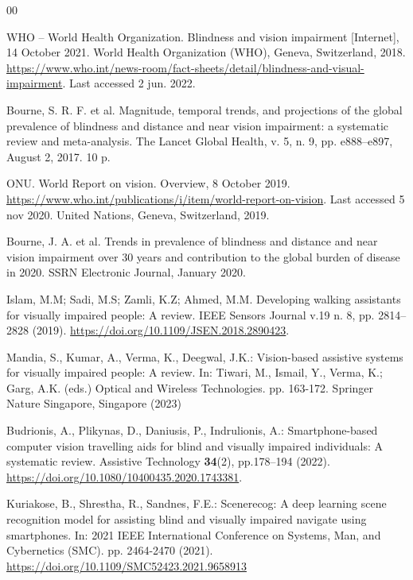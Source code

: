 \documentclass[final,5p,times,twocolumn]{elsarticle}
\begin{document}
\begin{thebibliography}{00}


WHO – World Health Organization. Blindness and vision impairment [Internet], 14 October 2021. World Health Organization (WHO), Geneva, Switzerland, 2018. \url{https://www.who.int/news-room/fact-sheets/detail/blindness-and-visual-impairment}. Last accessed 2 jun. 2022.

Bourne, S. R. F. et al. Magnitude, temporal trends, and projections of the global prevalence of blindness and distance and near vision impairment: a systematic review and meta-analysis. The Lancet Global Health, v. 5, n. 9, pp. e888--e897, August 2, 2017. 10 p.

ONU. World Report on vision. Overview, 8 October 2019. \url{https://www.who.int/publications/i/item/world-report-on-vision}. Last accessed 5 nov 2020. United Nations, Geneva, Switzerland, 2019.

Bourne, J. A. et al. Trends in prevalence of blindness and distance and near vision impairment over 30 years and contribution to the global burden of disease in 2020. SSRN Electronic Journal, January 2020.

Islam, M.M; Sadi, M.S; Zamli, K.Z; Ahmed, M.M. Developing walking assistants for visually impaired people: A review. IEEE Sensors Journal v.19 n. 8, pp. 2814--2828 (2019). \url{https://doi.org/10.1109/JSEN.2018.2890423}.

Mandia, S., Kumar, A., Verma, K., Deegwal, J.K.: Vision-based assistive systems for visually impaired people: A review. In: Tiwari, M., Ismail, Y., Verma, K.; Garg, A.K. (eds.) Optical and Wireless Technologies. pp. 163-172. Springer Nature Singapore, Singapore (2023)

Budrionis, A., Plikynas, D., Daniusis, P., Indrulionis, A.: Smartphone-based computer vision travelling aids for blind and visually impaired individuals: A systematic review. Assistive Technology \textbf{34}(2), pp.178--194 (2022). \url{https://doi.org/10.1080/10400435.2020.1743381}.

Kuriakose, B., Shrestha, R., Sandnes, F.E.: Scenerecog: A deep learning scene recognition model for assisting blind and visually impaired navigate using smartphones. In: 2021 IEEE International Conference on Systems, Man, and Cybernetics (SMC). pp. 2464-2470 (2021). \url{https://doi.org/10.1109/SMC52423.2021.9658913}


\end{thebibliography}
\end{document}
